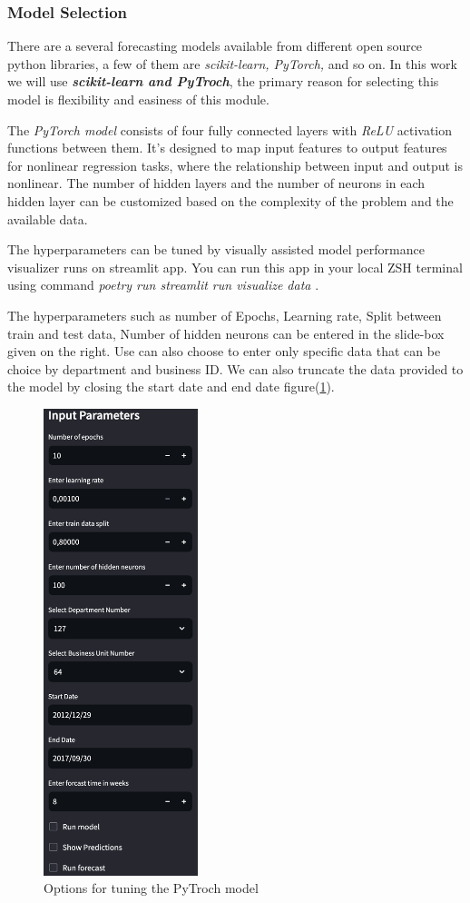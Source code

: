 \subsubsection*{Model Selection}
There are a several forecasting models available from different open source python libraries, a few of them are \textit{scikit-learn, PyTorch,} and so on. In this work we will use \textbf{\textit{scikit-learn and PyTroch}}, the primary reason for selecting this model is flexibility and easiness of this module.\par
The \textit{PyTorch model} consists of four fully connected layers with \textit{ReLU} activation functions between them. It's designed to map input features to output features for nonlinear regression tasks, where the relationship between input and output is nonlinear. The number of hidden layers and the number of neurons in each hidden layer can be customized based on the complexity of the problem and the available data.\par
The hyperparameters can be tuned by visually assisted model performance visualizer runs on streamlit app. You can run this app in your local ZSH terminal using command \textit{poetry run streamlit run visualize \textunderscore data }.\par
The hyperparameters such as number of Epochs, Learning rate, Split between train and test data, Number of hidden neurons can be entered in the slide-box given on the right. Use can also choose to enter only specific data that can be choice by department and business ID. We can also truncate the data provided to the model by closing the start date and end date figure(\ref{fig:11.1}).\par 
\begin{figure}
    \centering
    \includegraphics[width=0.4\textwidth]{figures/sidebar.png}
    \caption{Options for tuning the PyTroch model}
    \label{fig:11.1}
\end{figure}